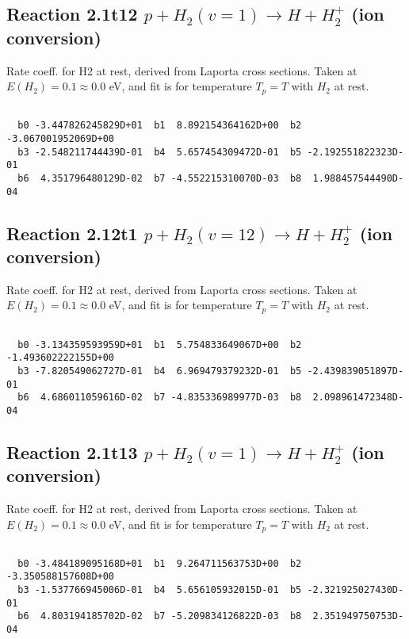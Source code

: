 \documentclass[12pt,dvipdfmx]{article}
\begin{document}
\newpage
\subsection{
Reaction 2.1t12
$ p + H_2(v=1) \rightarrow H + H_2^+$ (ion conversion)
}
Rate coeff. for H2 at rest, derived from Laporta cross sections.
Taken at $E(H_2) = 0.1 \approx 0.0$ eV,  and fit is for temperature $T_p=T$ with $H_2$ at rest.

\begin{small}\begin{verbatim}

  b0 -3.447826245829D+01  b1  8.892154364162D+00  b2 -3.067001952069D+00
  b3 -2.548211744439D-01  b4  5.657454309472D-01  b5 -2.192551822323D-01
  b6  4.351796480129D-02  b7 -4.552215310070D-03  b8  1.988457544490D-04

\end{verbatim}\end{small}

\newpage
\subsection{
Reaction 2.12t1
$ p + H_2(v=12) \rightarrow H + H_2^+$ (ion conversion)
}
Rate coeff. for H2 at rest, derived from Laporta cross sections.
Taken at $E(H_2) = 0.1 \approx 0.0$ eV,  and fit is for temperature $T_p=T$ with $H_2$ at rest.

\begin{small}\begin{verbatim}

  b0 -3.134359593959D+01  b1  5.754833649067D+00  b2 -1.493602222155D+00
  b3 -7.820549062727D-01  b4  6.969479379232D-01  b5 -2.439839051897D-01
  b6  4.686011059616D-02  b7 -4.835336989977D-03  b8  2.098961472348D-04

\end{verbatim}\end{small}

\newpage
\subsection{
Reaction 2.1t13
$ p + H_2(v=1) \rightarrow H + H_2^+$ (ion conversion)
}
Rate coeff. for H2 at rest, derived from Laporta cross sections.
Taken at $E(H_2) = 0.1 \approx 0.0$ eV,  and fit is for temperature $T_p=T$ with $H_2$ at rest.

\begin{small}\begin{verbatim}

  b0 -3.484189095168D+01  b1  9.264711563753D+00  b2 -3.350588157608D+00
  b3 -1.537766945006D-01  b4  5.656105932015D-01  b5 -2.321925027430D-01
  b6  4.803194185702D-02  b7 -5.209834126822D-03  b8  2.351949750753D-04

\end{verbatim}\end{small}
\end{document}
